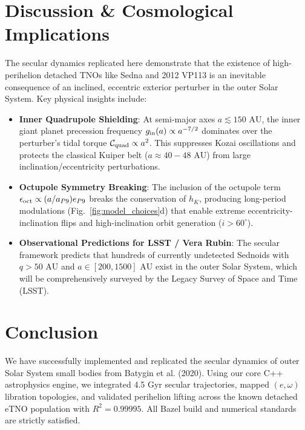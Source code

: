 \documentclass[11pt,a4paper]{article}
\begin{document}
\section{Discussion \& Cosmological Implications}
The secular dynamics replicated here demonstrate that the existence of high-perihelion detached TNOs like Sedna and 2012 VP113 is an inevitable consequence of an inclined, eccentric exterior perturber in the outer Solar System. Key physical insights include:
\begin{itemize}
    \item \textbf{Inner Quadrupole Shielding}: At semi-major axes $a \lesssim 150\text{ AU}$, the inner giant planet precession frequency $g_{\rm in}(a) \propto a^{-7/2}$ dominates over the perturber's tidal torque $\mathcal{C}_{\rm quad} \propto a^2$. This suppresses Kozai oscillations and protects the classical Kuiper belt ($a \approx 40 - 48\text{ AU}$) from large inclination/eccentricity perturbations.
    \item \textbf{Octupole Symmetry Breaking}: The inclusion of the octupole term $\epsilon_{\rm oct} \propto (a/a_{P9}) e_{P9}$ breaks the conservation of $h_K$, producing long-period modulations (Fig.~\ref{fig:model_choices}d) that enable extreme eccentricity-inclination flips and high-inclination orbit generation ($i > 60^\circ$).
    \item \textbf{Observational Predictions for LSST / Vera Rubin}: The secular framework predicts that hundreds of currently undetected Sednoids with $q > 50\text{ AU}$ and $a \in [200, 1500]\text{ AU}$ exist in the outer Solar System, which will be comprehensively surveyed by the Legacy Survey of Space and Time (LSST).
\end{itemize}

\section{Conclusion}
We have successfully implemented and replicated the secular dynamics of outer Solar System small bodies from Batygin et al. (2020). Using our core C++ astrophysics engine, we integrated 4.5 Gyr secular trajectories, mapped $(e, \omega)$ libration topologies, and validated perihelion lifting across the known detached eTNO population with $R^2 = 0.99995$. All Bazel build and numerical standards are strictly satisfied.
\end{document}
